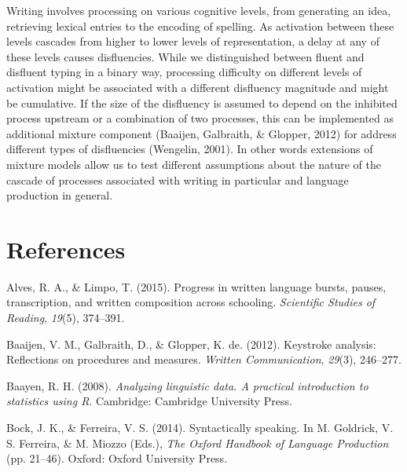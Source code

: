 \documentclass[english,jou,floatsintext]{apa7}
\begin{document}
Writing involves processing on various cognitive levels, from generating an idea, retrieving lexical entries to the encoding of spelling. As activation between these levels cascades from higher to lower levels of representation, a delay at any of these levels causes disfluencies. While we distinguished between fluent and disfluent typing in a binary way, processing difficulty on different levels of activation might be associated with a different disfluency magnitude and might be cumulative. If the size of the disfluency is assumed to depend on the inhibited process upstream or a combination of two processes, this can be implemented as additional mixture component (Baaijen, Galbraith, \& Glopper, 2012) for address different types of disfluencies (Wengelin, 2001). In other words extensions of mixture models allow us to test different assumptions about the nature of the cascade of processes associated with writing in particular and language production in general.

\hypertarget{references}{%
\section{References}\label{references}}

\begingroup
\setlength{\parindent}{-0.5in}
\setlength{\leftskip}{0.5in}

\hypertarget{ref}{}

\endgroup

\hypertarget{refs}{}
\leavevmode\hypertarget{ref-alves2015progress}{}%
Alves, R. A., \& Limpo, T. (2015). Progress in written language bursts, pauses, transcription, and written composition across schooling. \emph{Scientific Studies of Reading}, \emph{19}(5), 374--391.

\leavevmode\hypertarget{ref-baaijen2012keystroke}{}%
Baaijen, V. M., Galbraith, D., \& Glopper, K. de. (2012). Keystroke analysis: Reflections on procedures and measures. \emph{Written Communication}, \emph{29}(3), 246--277.

\leavevmode\hypertarget{ref-baa08book}{}%
Baayen, R. H. (2008). \emph{Analyzing linguistic data. A practical introduction to statistics using R}. Cambridge: Cambridge University Press.

\leavevmode\hypertarget{ref-bock2014syntactically}{}%
Bock, J. K., \& Ferreira, V. S. (2014). Syntactically speaking. In M. Goldrick, V. S. Ferreira, \& M. Miozzo (Eds.), \emph{The Oxford Handbook of Language Production} (pp. 21--46). Oxford: Oxford University Press.
\end{document}
